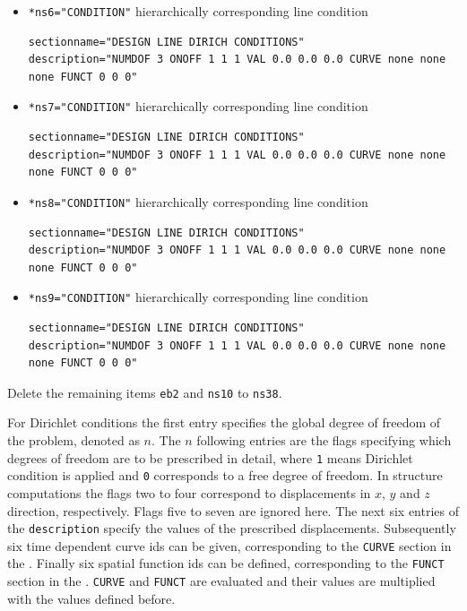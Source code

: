 \begin{itemize}
 \item \verb|*ns6="CONDITION"| \qquad hierarchically corresponding line condition
 \begin{small} \begin{verbatim}
sectionname="DESIGN LINE DIRICH CONDITIONS"
description="NUMDOF 3 ONOFF 1 1 1 VAL 0.0 0.0 0.0 CURVE none none none FUNCT 0 0 0"
 \end{verbatim} \end{small}
 
 \item \verb|*ns7="CONDITION"| \qquad hierarchically corresponding line condition
 \begin{small} \begin{verbatim}
sectionname="DESIGN LINE DIRICH CONDITIONS"
description="NUMDOF 3 ONOFF 1 1 1 VAL 0.0 0.0 0.0 CURVE none none none FUNCT 0 0 0"
 \end{verbatim} \end{small}
 
 \item \verb|*ns8="CONDITION"| \qquad hierarchically corresponding line condition
 \begin{small} \begin{verbatim}
sectionname="DESIGN LINE DIRICH CONDITIONS"
description="NUMDOF 3 ONOFF 1 1 1 VAL 0.0 0.0 0.0 CURVE none none none FUNCT 0 0 0"
 \end{verbatim} \end{small}
 
 \item \verb|*ns9="CONDITION"| \qquad hierarchically corresponding line condition
 \begin{small} \begin{verbatim}
sectionname="DESIGN LINE DIRICH CONDITIONS"
description="NUMDOF 3 ONOFF 1 1 1 VAL 0.0 0.0 0.0 CURVE none none none FUNCT 0 0 0"
 \end{verbatim} \end{small}

\end{itemize}

Delete the remaining items \verb|eb2| and \verb|ns10| to \verb|ns38|. \newline

For Dirichlet conditions the first entry specifies the global degree of freedom of the problem, denoted as $n$. The $n$ following entries are the flags specifying which degrees of freedom are to be prescribed in detail, where \verb|1| means Dirichlet condition is applied and \verb|0| corresponds to a free degree of freedom. In structure computations the flags two to four correspond to displacements in $x$, $y$ and $z$ direction, respectively. Flags five to seven are ignored here. The next six entries of the \verb|description| specify the values of the prescribed displacements. Subsequently six time dependent curve ids can be given, corresponding to the \verb|CURVE| section in the \head. Finally six spatial function ids can be defined, corresponding to the \verb|FUNCT| section in the \head. \verb|CURVE| and \verb|FUNCT| are evaluated and their values are multiplied with the values defined before. \newline

